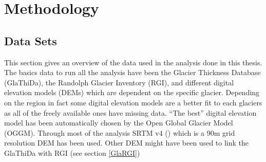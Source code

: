 \chapter{Methodology}\label{chap2}
\thispagestyle{plain}





\section{Data Sets}\label{glathida}
This section gives an overview of the data used in the analysis done in this thesis. The basics data to run all the analysis have been the Glacier Thickness Database (GlaThiDa), the Randolph Glacier Inventory (RGI), and different digital elevation models (DEMs) which are dependent on the specific glacier. Depending on the region in fact some digital elevation models are a better fit to each glaciers as all of the freely available ones have missing data. ``The best'' digital elevation model has been automatically chosen by the Open Global Glacier Model (OGGM). Through most of the analysis SRTM v4 (\citet{SRTM}) which is a 90m grid resolution DEM has been used. Other DEM might have been used to link the GlaThiDa with RGI (see section \ref{GlaRGI})

